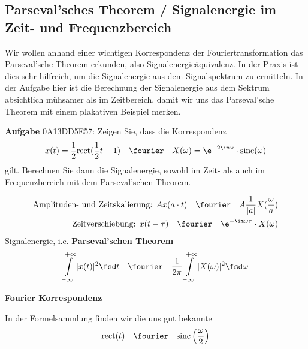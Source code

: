 \subsection{Parseval'sches Theorem / Signalenergie im Zeit- und Frequenzbereich}
\label{sec:0A13DD5E57}
\begin{Ziel}
Wir wollen anhand einer wichtigen Korrespondenz der Fouriertransformation das
Parseval'sche Theorem erkunden, also Signalenergieäquivalenz.
In der Praxis ist dies sehr hilfreich,
um die Signalenergie aus dem Signalspektrum zu ermitteln.
In der Aufgabe hier ist die Berechnung der Signalenergie aus dem Sektrum
absichtlich mühsamer als im Zeitbereich, damit wir uns das Parseval'sche Theorem
mit einem plakativen Beispiel merken.
\end{Ziel}
\textbf{Aufgabe} {\tiny 0A13DD5E57}: Zeigen Sie, dass die Korrespondenz
\begin{equation}
x(t) = \frac{1}{2} \mathrm{rect}(\frac{1}{2}t - 1) \quad\fourier\quad X(\omega)=\e^{-2 \im \omega} \cdot \mathrm{sinc}(\omega)
\end{equation}
gilt.
Berechnen Sie dann die Signalenergie, sowohl im Zeit- als auch im Frequenzbereich mit dem
Parseval'schen Theorem.
\begin{Werkzeug}
\begin{align}
\text{Amplituden- und Zeitskalierung:   } A x(a \cdot t) \quad\fourier\quad A \frac{1}{|a|} X(\frac{\omega}{a})\\
\text{Zeitverschiebung:  } x(t - \tau)  \quad\fourier\quad \e^{-\im \omega \tau} \cdot X(\omega)
\end{align}
Signalenergie, i.e. \textbf{Parseval'schen Theorem}
\begin{equation}
  \int\limits_{-\infty}^{+\infty} |x(t)|^2 \fsd t
  \quad\fourier\quad
  \frac{1}{2\pi}\int\limits_{-\infty}^{+\infty} |X(\omega)|^2 \fsd \omega
\end{equation}
\end{Werkzeug}
\begin{Ansatz}
\textbf{Fourier Korrespondenz}

In der Formelsammlung finden wir die uns gut bekannte
\begin{equation}
\mathrm{rect}(t) \quad\fourier\quad \mathrm{sinc}\left(\frac{\omega}{2}\right)
\end{equation}
\end{Ansatz}
